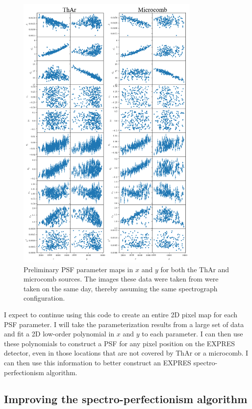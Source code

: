 \documentclass[11pt]{article}
\begin{document}
\begin{figure}
    \centering
    \includegraphics[width=0.8\textwidth]{images/psf_params.png}
    \caption{Preliminary PSF parameter maps in $x$ and $y$ for both the ThAr and microcomb sources. The images these data were taken from were taken on the same day, thereby assuming the same spectrograph configuration.}
    \label{fig:psf_params}
\end{figure}

I expect to continue using this code to create an entire 2D pixel map for each PSF parameter. I will take the parameterization results from a large set of data and fit a 2D low-order polynomial in $x$ and $y$ to each parameter. I can then use these polynomials to construct a PSF for any pixel position on the EXPRES detector, even in those locations that are not covered by ThAr or a microcomb. I can then use this information to better construct an EXPRES spectro-perfectionism algorithm.

\subsection{Improving the spectro-perfectionism algorithm}
\end{document}
